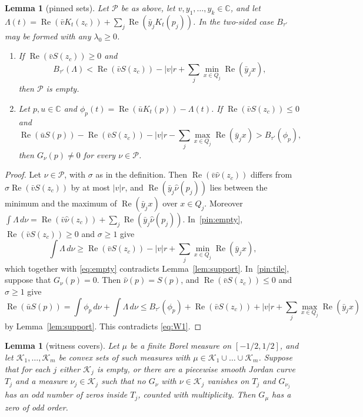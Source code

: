\documentclass[11pt]{amsart}
\newtheorem{lemma}[theorem]{Lemma}
\theoremstyle{definition}
\theoremstyle{remark}
\numberwithin{equation}{section}
\newcommand{\C}{\mathbb{C}}
\newcommand{\re}{\operatorname{Re}}
\begin{document}
\begin{lemma}[pinned sets]\label{lem:pinned}
Let $\mathcal P$ be as above, let $v,y_1,\dots,y_k\in\C$, and let $\Lambda(t)=\re(\bar vK_t(z_c))+\sum_j\re(\bar y_jK_t(p_j))$. In the two-sided case $B_{\tau'}$ may be formed with any $\lambda_0\ge0$.
\begin{enumerate}[label=(\alph*)]
\item\label{pin:empty} If $\re(\bar vS(z_c))\ge0$ and
\begin{equation}\label{eq:empty}
B_{\tau'}(\Lambda)<\re(\bar vS(z_c))-|v|r+\sum_j\min_{x\in Q_j}\re(\bar y_jx),
\end{equation}
then $\mathcal P$ is empty.
\item\label{pin:tile} Let $p,u\in\C$ and $\phi_p(t)=\re(\bar uK_t(p))-\Lambda(t)$. If $\re(\bar vS(z_c))\le0$ and
\begin{equation}\label{eq:W1}
\re(\bar uS(p))-\re(\bar vS(z_c))-|v|r-\sum_j\max_{x\in Q_j}\re(\bar y_jx)>B_{\tau'}(\phi_p),
\end{equation}
then $G_\nu(p)\ne0$ for every $\nu\in\mathcal P$.
\end{enumerate}
\end{lemma}

\begin{proof}
Let $\nu\in\mathcal P$, with $\sigma$ as in the definition. Then $\re(\bar v\hat\nu(z_c))$ differs from $\sigma\re(\bar vS(z_c))$ by at most $|v|r$, and $\re(\bar y_j\hat\nu(p_j))$ lies between the minimum and the maximum of $\re(\bar y_jx)$ over $x\in Q_j$. Moreover $\int\Lambda\,d\nu=\re(\bar v\hat\nu(z_c))+\sum_j\re(\bar y_j\hat\nu(p_j))$. In~\ref{pin:empty}, $\re(\bar vS(z_c))\ge0$ and $\sigma\ge1$ give
\[
\int\Lambda\,d\nu\ge\re(\bar vS(z_c))-|v|r+\sum_j\min_{x\in Q_j}\re(\bar y_jx),
\]
which together with \eqref{eq:empty} contradicts Lemma~\ref{lem:support}. In~\ref{pin:tile}, suppose that $G_\nu(p)=0$. Then $\hat\nu(p)=S(p)$, and $\re(\bar vS(z_c))\le0$ and $\sigma\ge1$ give
\[
\re(\bar uS(p))=\int\phi_p\,d\nu+\int\Lambda\,d\nu\le B_{\tau'}(\phi_p)+\re(\bar vS(z_c))+|v|r+\sum_j\max_{x\in Q_j}\re(\bar y_jx)
\]
by Lemma~\ref{lem:support}. This contradicts \eqref{eq:W1}.
\end{proof}

\begin{lemma}[witness covers]\label{lem:convex}
Let $\mu$ be a finite Borel measure on $[-1/2,1/2]$, and let $\mathcal K_1,\dots,\mathcal K_m$ be convex sets of such measures with $\mu\in\mathcal K_1\cup\dots\cup\mathcal K_m$. Suppose that for each $j$ either $\mathcal K_j$ is empty, or there are a piecewise smooth Jordan curve $T_j$ and a measure $\nu_j\in\mathcal K_j$ such that no $G_\nu$ with $\nu\in\mathcal K_j$ vanishes on $T_j$ and $G_{\nu_j}$ has an odd number of zeros inside $T_j$, counted with multiplicity. Then $G_\mu$ has a zero of odd order.
\end{lemma}
\end{document}
